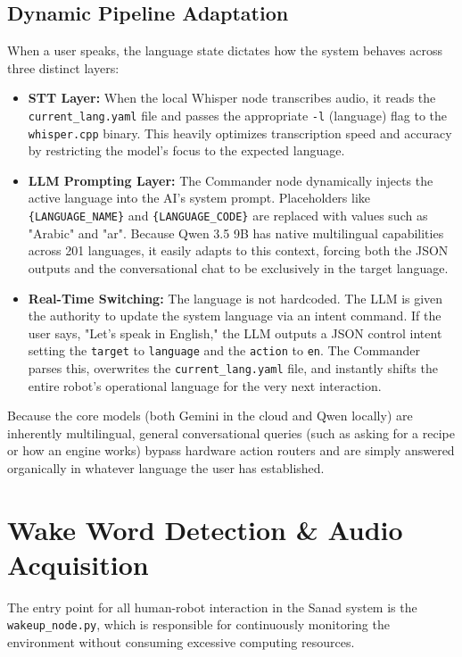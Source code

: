 \subsection{Dynamic Pipeline Adaptation}
When a user speaks, the language state dictates how the system behaves across three distinct layers:
\begin{itemize}
    \item \textbf{STT Layer:} When the local Whisper node transcribes audio, it reads the \texttt{current\_lang.yaml} file and passes the appropriate \texttt{-l} (language) flag to the \texttt{whisper.cpp} binary. This heavily optimizes transcription speed and accuracy by restricting the model's focus to the expected language.
    \item \textbf{LLM Prompting Layer:} The Commander node dynamically injects the active language into the AI's system prompt. Placeholders like \texttt{\{LANGUAGE\_NAME\}} and \texttt{\{LANGUAGE\_CODE\}} are replaced with values such as "Arabic" and "ar". Because Qwen 3.5 9B has native multilingual capabilities across 201 languages, it easily adapts to this context, forcing both the JSON outputs and the conversational chat to be exclusively in the target language.
    \item \textbf{Real-Time Switching:} The language is not hardcoded. The LLM is given the authority to update the system language via an intent command. If the user says, "Let's speak in English," the LLM outputs a JSON control intent setting the \texttt{target} to \texttt{language} and the \texttt{action} to \texttt{en}. The Commander parses this, overwrites the \texttt{current\_lang.yaml} file, and instantly shifts the entire robot's operational language for the very next interaction.
\end{itemize}

Because the core models (both Gemini in the cloud and Qwen locally) are inherently multilingual, general conversational queries (such as asking for a recipe or how an engine works) bypass hardware action routers and are simply answered organically in whatever language the user has established.

\section{Wake Word Detection \& Audio Acquisition}
The entry point for all human-robot interaction in the Sanad system is the \texttt{wakeup\_node.py}, which is responsible for continuously monitoring the environment without consuming excessive computing resources.


